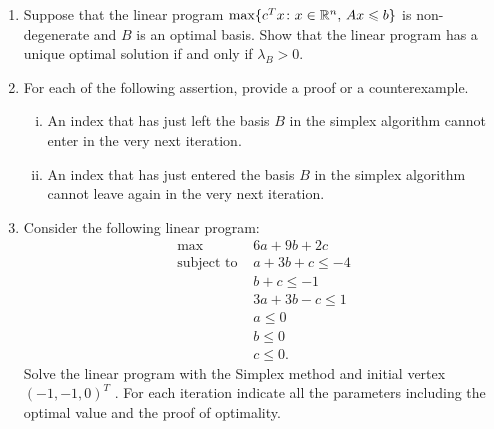 \documentclass[11pt]{article}
\renewcommand{\leq}{\leqslant}
\begin{document}
\begin{enumerate}[1)]
\item Suppose that the linear program $\max \{c^Tx \colon x \in \R^n, \, Ax \leq b\}$ is non-degenerate and $B$ is an optimal basis. Show that the linear program has a unique optimal solution if and only if $\lambda_B>0$. 


\item For each of the following assertion, provide a proof or a counterexample. 
  \begin{enumerate}[i)]
  \item An index that has just left the basis $B$ in the simplex
    algorithm cannot enter in the very next iteration.
  \item An index that has just entered the basis $B$ in the simplex
    algorithm cannot leave again in the very next iteration. 
  \end{enumerate}
  
  
\item Consider the following linear program:
\begin{align*}
\max  \quad & 6a+ 9b+ 2c \\
\text{subject to } & a+ 3b+ c ≤−4 \\
&b+ c ≤−1 \\
& 3a+ 3b−c ≤1 \\
& a ≤0  \\
& b ≤0 \\
& c ≤0. 
\end{align*}
Solve the linear program with the Simplex method and initial vertex $(−1,−1,0)^T$ . For each iteration indicate all the parameters including the optimal value and the proof of optimality.
  




\end{enumerate}



  
\end{document}
